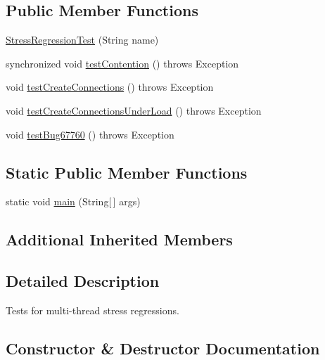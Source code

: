 \subsection*{Public Member Functions}
\begin{DoxyCompactItemize}
\item 
\mbox{\hyperlink{classtestsuite_1_1regression_1_1_stress_regression_test_af77a090b18d23b503f859cc03238666a}{Stress\+Regression\+Test}} (String name)
\item 
synchronized void \mbox{\hyperlink{classtestsuite_1_1regression_1_1_stress_regression_test_a9e52f4e90a98cc513dfd3318d348c531}{test\+Contention}} ()  throws Exception 
\item 
void \mbox{\hyperlink{classtestsuite_1_1regression_1_1_stress_regression_test_a8253fc7fb64e884132640398b2bc5aed}{test\+Create\+Connections}} ()  throws Exception 
\item 
void \mbox{\hyperlink{classtestsuite_1_1regression_1_1_stress_regression_test_a1aff86540d35db22db56f48ffeb64b9d}{test\+Create\+Connections\+Under\+Load}} ()  throws Exception 
\item 
void \mbox{\hyperlink{classtestsuite_1_1regression_1_1_stress_regression_test_a21dd782b4c69fab5bcaee492e3400303}{test\+Bug67760}} ()  throws Exception 
\end{DoxyCompactItemize}
\subsection*{Static Public Member Functions}
\begin{DoxyCompactItemize}
\item 
static void \mbox{\hyperlink{classtestsuite_1_1regression_1_1_stress_regression_test_a4ebefbb66146f2d6d7401978c038b691}{main}} (String\mbox{[}$\,$\mbox{]} args)
\end{DoxyCompactItemize}
\subsection*{Additional Inherited Members}


\subsection{Detailed Description}
Tests for multi-\/thread stress regressions. 

\subsection{Constructor \& Destructor Documentation}
\mbox{\label{classtestsuite_1_1regression_1_1_stress_regression_test_af77a090b18d23b503f859cc03238666a}} 
